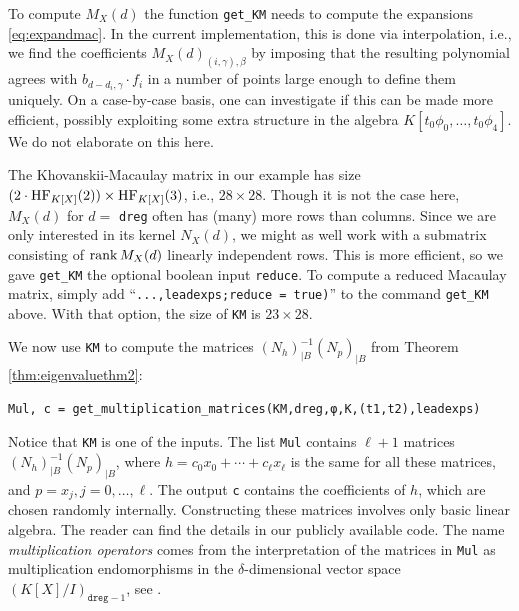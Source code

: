 \documentclass[12pt]{article}
\theoremstyle{definition}
\theoremstyle{remark}
\begin{document}
To compute $M_X(d)$ the function \texttt{get\_KM} needs to compute the expansions \eqref{eq:expandmac}. In the current implementation, this is done via interpolation, i.e., we find the coefficients $M_X(d)_{(i,\gamma),\beta}$ by imposing that the resulting polynomial agrees with $b_{d-d_i,\gamma} \cdot f_i$ in a number of points large enough to define them uniquely. On a case-by-case basis, one can investigate if this can be made more efficient, possibly exploiting some extra structure in the algebra $K[t_0 \phi_0, \ldots, t_0 \phi_4]$. We do not elaborate on this here. 

The Khovanskii-Macaulay matrix in our example has size $(2 \cdot {\rm HF}_{K[X]}(2) ) \times {\rm HF}_{K[X]}(3)$, i.e., $28 \times 28$. Though it is not the case here,  $M_X(d)$ for $d =$ \texttt{dreg} often has (many) more rows than columns. Since we are only interested in its kernel $N_X(d)$, we might as well work with a submatrix consisting of ${\rm rank}\, M_X(d)$ linearly independent rows. This is more efficient, so we gave \texttt{get\_KM} the optional boolean input \texttt{reduce}. To compute a reduced Macaulay matrix, simply add ``\texttt{...,leadexps;reduce = true)}'' to the command \texttt{get\_KM} above. With that option, the size of \texttt{KM} is $23 \times 28$.

We now use \texttt{KM} to compute the matrices $(N_h)_{|B}^{-1} (N_p)_{|B}$ from Theorem \ref{thm:eigenvaluethm2}:
\begin{verbatim}
Mul, c = get_multiplication_matrices(KM,dreg,φ,K,(t1,t2),leadexps)
\end{verbatim}
Notice that \texttt{KM} is one of the inputs. The list \texttt{Mul} contains $\ell + 1$ matrices $(N_h)_{|B}^{-1} (N_p)_{|B}$, where $h = c_0x_0 + \cdots + c_\ell x_\ell$ is the same for all these matrices, and $p = x_j, j = 0, \ldots, \ell$. The output \texttt{c} contains the coefficients of $h$, which are chosen randomly internally. Constructing these matrices involves only basic linear algebra. The reader can find the details in our publicly available code. The name \emph{multiplication operators} comes from the interpretation of the matrices in \texttt{Mul} as multiplication endomorphisms in the $\delta$-dimensional vector space $(K[X]/I)_{\mathtt{dreg}-1}$, see \cite[Section 4.5]{telen2020thesis}.
\end{document}
